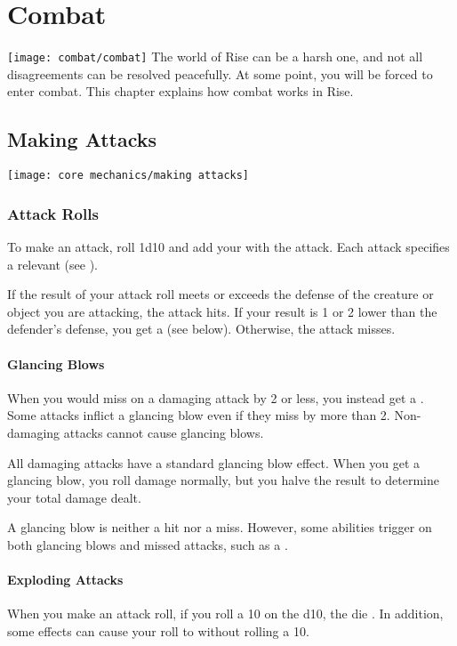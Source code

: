 \chapter{Combat}\label{Combat}
    \texttt{[image: combat/combat]}
    The world of Rise can be a harsh one, and not all disagreements can be resolved peacefully.
    At some point, you will be forced to enter combat.
    This chapter explains how combat works in Rise.

\section{Making Attacks}\label{Attacks}
    \texttt{[image: core mechanics/making attacks]}

    \subsection{Attack Rolls}\label{Attack Rolls}
        To make an attack, roll 1d10 and add your  with the attack.
        Each attack specifies a relevant  (see ).

        If the result of your attack roll meets or exceeds the defense of the creature or object you are attacking, the attack hits.
        If your result is 1 or 2 lower than the defender's defense, you get a  (see below).
        Otherwise, the attack misses.

        \subsubsection{Glancing Blows}\label{Glancing Blows}
            When you would miss on a damaging attack by 2 or less, you instead get a .
            Some attacks inflict a glancing blow even if they miss by more than 2.
            Non-damaging attacks cannot cause glancing blows.

            All damaging attacks have a standard glancing blow effect.
            When you get a glancing blow, you roll damage normally, but you halve the result to determine your total damage dealt.

            A glancing blow is neither a hit nor a miss.
            However, some abilities trigger on both glancing blows and missed attacks, such as a .

        \subsubsection{Exploding Attacks}\label{Exploding Attacks}
            When you make an attack roll, if you roll a 10 on the d10, the die .
            In addition, some effects can cause your roll to  without rolling a 10.

